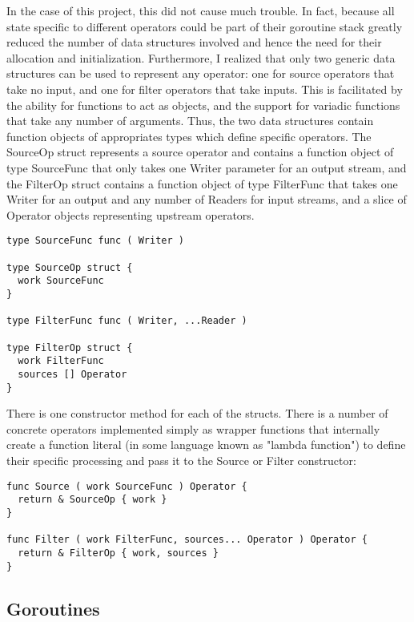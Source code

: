 \documentclass {article}
\begin{document}
In the case of this project, this did not cause much trouble. In fact, because all state specific to different operators could be part of their goroutine stack greatly reduced the number of data structures involved and hence the need for their allocation and initialization. Furthermore, I realized that only two generic data structures can be used to represent any operator: one for source operators that take no input, and one for filter operators that take inputs. This is facilitated by the ability for functions to act as objects, and the support for variadic functions that take any number of arguments. Thus, the two data structures contain function objects of appropriates types which define specific operators. The SourceOp struct represents a source operator and contains a function object of type SourceFunc that only takes one Writer parameter for an output stream, and the FilterOp struct contains a function object of type FilterFunc that takes one Writer for an output and any number of Readers for input streams, and a slice of Operator objects representing upstream operators.

\begin{lstlisting}
type SourceFunc func ( Writer )

type SourceOp struct {
  work SourceFunc
}

type FilterFunc func ( Writer, ...Reader )

type FilterOp struct {
  work FilterFunc
  sources [] Operator
}
\end{lstlisting}

There is one constructor method for each of the structs. There is a number of concrete operators implemented simply as wrapper functions that internally create a function literal (in some language known as "lambda function") to define their specific processing and pass it to the Source or Filter constructor:

\begin{lstlisting}
func Source ( work SourceFunc ) Operator {
  return & SourceOp { work }
}

func Filter ( work FilterFunc, sources... Operator ) Operator {
  return & FilterOp { work, sources }
}
\end{lstlisting}


\subsection{Goroutines}
\end{document}
